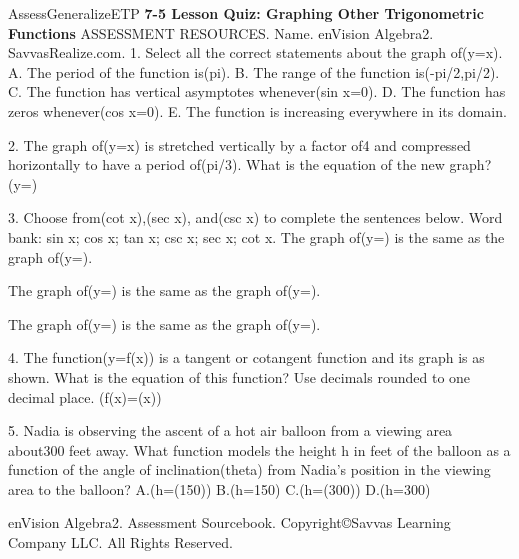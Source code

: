 \documentclass{article}
\newenvironment{te-addendum}[2]{}{}     %
\newcommand{\answer}[1]{}               %
\newcommand{\placeholder}[2]{}          %
\begin{document}
\begin{te-addendum}{Assess}{GeneralizeETP}
\textbf{7-5 Lesson Quiz: Graphing Other Trigonometric Functions}
ASSESSMENT RESOURCES. Name\underline{\hspace{2cm}}. enVision Algebra2. SavvasRealize.com.
1. Select all the correct statements about the graph of(y=\tan x).
A. The period of the function is(pi).
B. The range of the function is(-pi/2,pi/2).
C. The function has vertical asymptotes whenever(sin x=0).
D. The function has zeros whenever(cos x=0).
E. The function is increasing everywhere in its domain.
\answer{1.A,E}
2. The graph of(y=\tan x) is stretched vertically by a factor of4 and compressed horizontally to have a period of(pi/3). What is the equation of the new graph?
(y=\underline{\hspace{1cm}}\tan\underline{\hspace{1cm}})
\answer{2.(y=4\tan3x)}
3. Choose from(cot x),(sec x), and(csc x) to complete the sentences below.
Word bank: sin x; cos x; tan x; csc x; sec x; cot x.
The graph of(y=) is the same as the graph of(y=\underline{\hspace{1cm}}).
\answer{csc x}
The graph of(y=) is the same as the graph of(y=\underline{\hspace{1cm}}).
\answer{sec x}
The graph of(y=) is the same as the graph of(y=\underline{\hspace{1cm}}).
\answer{cot x}
4. The function(y=f(x)) is a tangent or cotangent function and its graph is as shown.
What is the equation of this function? Use decimals rounded to one decimal place.
(f(x)=\underline{\hspace{1cm}}\cot(\underline{\hspace{1cm}}x))
\placeholder{graph}{Black0.5cot4x,arrowed x,y axes,O; xgridpi/16 labels-pi/4,pi/4;ygrid1/4 labels-1,1;window-5pi/16..5pi/16,-5/4..5/4. Decreasingbranches withzeros+-pi/8,asymptotes-pi/4,0,pi/4 notdrawn,end arrows.}
\answer{4.(f(x)=0.5\cot(4x))}
5. Nadia is observing the ascent of a hot air balloon from a viewing area about300 feet away. What function models the height h in feet of the balloon as a function of the angle of inclination(theta) from Nadia's position in the viewing area to the balloon?
A.(h=\tan(150\theta))
B.(h=150\tan\theta)
C.(h=\tan(300\theta))
D.(h=300\tan\theta)
\answer{5.D}
enVision Algebra2. Assessment Sourcebook. Copyright©Savvas Learning Company LLC. All Rights Reserved.
\end{te-addendum}
\end{document}

